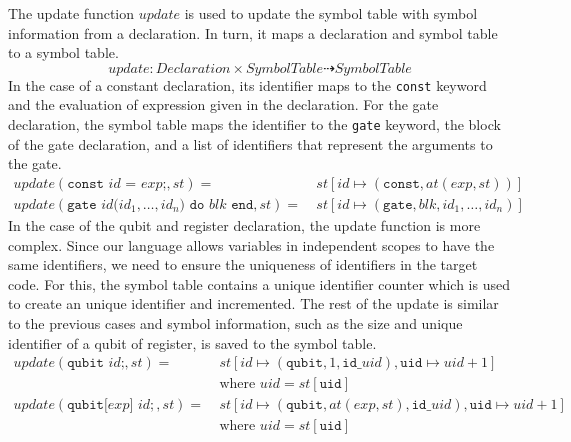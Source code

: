 The update function $update$ is used to update the symbol table with symbol information from a declaration. In turn, it maps a declaration and symbol table to a symbol table.
\begin{equation*}
    update :  Declaration \times SymbolTable \dashrightarrow SymbolTable
\end{equation*}
In the case of a constant declaration, its identifier maps to the \texttt{const} keyword and the evaluation of expression given in the declaration. For the gate declaration, the symbol table maps the identifier to the \texttt{gate} keyword, the block of the gate declaration, and a list of identifiers that represent the arguments to the gate.  
\begin{align*}
    update(\texttt{const } id \texttt{ = } exp \texttt{;}, st) = \ & st[id \mapsto (\texttt{const}, at(exp, st))]\\
    update(\texttt{gate } id \texttt{(}id_1, \dots, id_n\texttt{)} \texttt{ do } blk \texttt{ end}, st) = \ & st[id \mapsto (\texttt{gate}, blk, id_1, \dots, id_n)]
\end{align*}
In the case of the qubit and register declaration, the update function is more complex. Since our language allows variables in independent scopes to have the same identifiers, we need to ensure the uniqueness of identifiers in the target code. For this, the symbol table contains a unique identifier counter which is used to create an unique identifier and incremented. The rest of the update is similar to the previous cases and symbol information, such as the size and unique identifier of a qubit of register, is saved to the symbol table.   
\begin{align*}
    update(\texttt{qubit } id\texttt{;}, st) = \ & st[id \mapsto (\texttt{qubit}, 1, \texttt{id\_}uid), \texttt{uid} \mapsto uid + 1]\\
                                                 & \text{where } uid = st[\texttt{uid}]\\
    update(\texttt{qubit[} exp \texttt{] } id{;}, st) = \ & st[id \mapsto (\texttt{qubit}, at(exp, st), \texttt{id\_}uid), \texttt{uid} \mapsto uid + 1]\\
                                                 & \text{where } uid = st[\texttt{uid}]
\end{align*}

